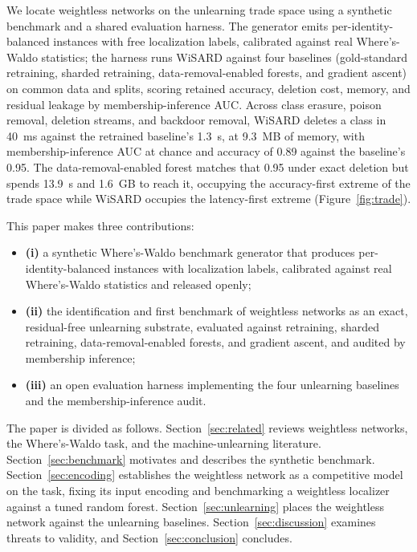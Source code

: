 We locate weightless networks on the unlearning trade space using a synthetic benchmark and a shared evaluation harness. The generator emits per-identity-balanced instances with free localization labels, calibrated against real Where's-Waldo statistics; the harness runs WiSARD against four baselines (gold-standard retraining, sharded retraining, data-removal-enabled forests, and gradient ascent) on common data and splits, scoring retained accuracy, deletion cost, memory, and residual leakage by membership-inference AUC. Across class erasure, poison removal, deletion streams, and backdoor removal, WiSARD deletes a class in 40~ms against the retrained baseline's 1.3~s, at 9.3~MB of memory, with membership-inference AUC at chance and accuracy of 0.89 against the baseline's 0.95. The data-removal-enabled forest matches that 0.95 under exact deletion but spends 13.9~s and 1.6~GB to reach it, occupying the accuracy-first extreme of the trade space while WiSARD occupies the latency-first extreme (Figure~\ref{fig:trade}).

This paper makes three contributions:
\begin{itemize}
  \item \textbf{(i)} a synthetic Where's-Waldo benchmark generator that produces per-identity-balanced instances with localization labels, calibrated against real Where's-Waldo statistics and released openly;
  \item \textbf{(ii)} the identification and first benchmark of weightless networks as an exact, residual-free unlearning substrate, evaluated against retraining, sharded retraining, data-removal-enabled forests, and gradient ascent, and audited by membership inference;
  \item \textbf{(iii)} an open evaluation harness implementing the four unlearning baselines and the membership-inference audit.
\end{itemize}

The paper is divided as follows. Section~\ref{sec:related} reviews weightless networks, the Where's-Waldo task, and the machine-unlearning literature. Section~\ref{sec:benchmark} motivates and describes the synthetic benchmark. Section~\ref{sec:encoding} establishes the weightless network as a competitive model on the task, fixing its input encoding and benchmarking a weightless localizer against a tuned random forest. Section~\ref{sec:unlearning} places the weightless network against the unlearning baselines. Section~\ref{sec:discussion} examines threats to validity, and Section~\ref{sec:conclusion} concludes.

